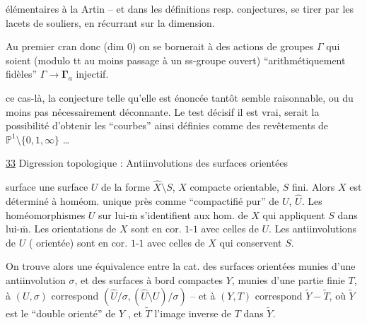 élémentaires à la Artin -- et dans les définitions resp. conjectures, se tirer par les lacets de souliers, en récurrant sur la dimension.

Au premier cran donc (dim $0$) on se bornerait à des actions de groupes $\Gamma$ qui soient (modulo tt au moins passage à un ss-groupe ouvert) ``arithmétiquement fidèles''  $\Gamma\to\boldsymbol{\Gamma}_a$ injectif.

 ce cas-là, la conjecture telle qu'elle est énoncée tantôt semble raisonnable, ou du moins pas nécessairement déconnante. Le test décisif\unsure{,|,:} il est vrai, serait la possibilité d'obtenir les ``courbes'' ainsi définies comme des revêtements de $\mathbb{P}^1\setminus\{0,1,\infty\}$ \ldots
{}

\uline{33} Digression topologique :
Antiinvolutions des surfaces orientées 


 surface  une surface $U$ de la forme $\widehat X\setminus S$, $X$  compacte orientable, $S$ fini. Alors $X$ est déterminé à homéom. unique près comme ``compactifié pur'' de $U$,  $\widehat U$.  Les homéomorphismes $U$ sur lui-$\overline{\mathrm m}$ s'identifient aux hom. de $X$ qui appliquent $S$ dans lui-$\overline{\mathrm m}$. Les orientations de $X$ sont en cor. $1$-$1$ avec celles de $U$. Les antiinvolutions de $U$ ( orientée) sont en cor. $1$-$1$ avec celles de $X$ qui conservent $S$.

On trouve alors une équivalence entre la cat. des surfaces orientées   munies d'une antiinvolution $\sigma$, et des surfaces à bord compactes $Y$, munies d'une partie finie $T$, à $(U,\sigma)$ correspond $(\widehat U/\sigma,(\widehat U\setminus U)/\sigma)$ -- et à $(Y,T)$ correspond $\widetilde Y-\widetilde T$, où $\widetilde Y$ est le ``double orienté'' de $Y$ , et $\widetilde T$ l'image inverse de $T$ dans $\widetilde Y$.

